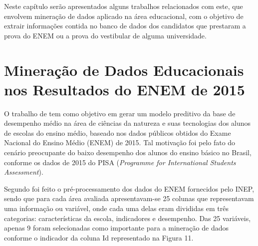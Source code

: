 \label{chapter:correlatos}

\par
Neste capítulo serão apresentados alguns trabalhos relacionados com este, que envolvem mineração de dados aplicado na área educacional, com o objetivo de extrair informações contida no banco de dados dos candidatos que prestaram a prova do ENEM ou a prova do vestibular de alguma universidade.

\section{Mineração de Dados Educacionais nos Resultados do ENEM de 2015}

\par
O trabalho de  tem como objetivo em gerar um modelo preditivo da base de desempenho médio na área de ciências da natureza e suas tecnologias dos alunos de escolas do ensino médio, baseado nos dados públicos obtidos do Exame Nacional do Ensino Médio (ENEM) de 2015. Tal motivação foi pelo fato do cenário preocupante do baixo desempenho dos alunos do ensino básico no Brasil, conforme os dados de 2015 do PISA (\textit{Programme for International Students Assessment}).

\par
Segundo  foi feito o pré-processamento dos dados do ENEM fornecidos pelo INEP, sendo que para cada área avaliada apresentavam-se 25 colunas que representavam uma informação ou variável, onde cada uma delas eram divididas em três categorias: características da escola, indicadores e desempenho. Das 25 variáveis, apenas 9 foram selecionadas como importante para a mineração de dados conforme o indicador da coluna Id representado na Figura 11. 

